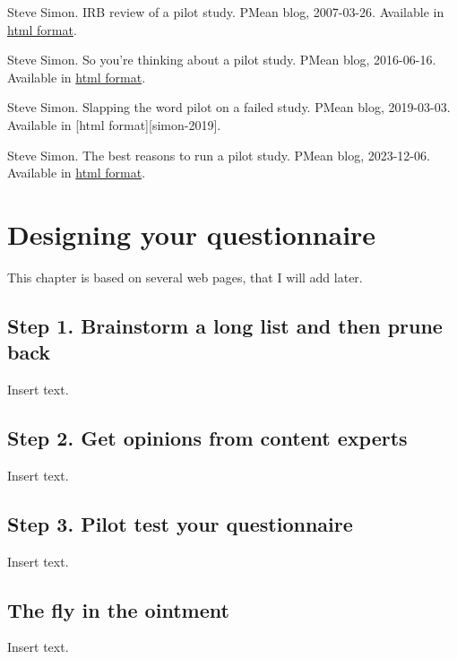 \documentclass[
  letterpaper,
  DIV=11,
  numbers=noendperiod]{scrreprt}
\begin{document}
Steve Simon. IRB review of a pilot study. PMean blog, 2007-03-26.
Available in \href{http://www.new.pmean.com/irb-review-pilot/}{html
format}.

Steve Simon. So you're thinking about a pilot study. PMean blog,
2016-06-16. Available in \href{http://blog.pmean.com/pilot-study/}{html
format}.

Steve Simon. Slapping the word pilot on a failed study. PMean blog,
2019-03-03. Available in {[}html format{]}{[}simon-2019{]}.

Steve Simon. The best reasons to run a pilot study. PMean blog,
2023-12-06. Available in
\href{http://new.pmean.com/reasons-to-run-a-pilot/}{html format}.


\chapter{Designing your
questionnaire}\label{designing-your-questionnaire}

This chapter is based on several web pages, that I will add later.

\section{Step 1. Brainstorm a long list and then prune
back}\label{step-1.-brainstorm-a-long-list-and-then-prune-back}

Insert text.

\section{Step 2. Get opinions from content
experts}\label{step-2.-get-opinions-from-content-experts}

Insert text.

\section{Step 3. Pilot test your
questionnaire}\label{step-3.-pilot-test-your-questionnaire}

Insert text.

\section{The fly in the ointment}\label{the-fly-in-the-ointment-3}

Insert text.

\end{document}

